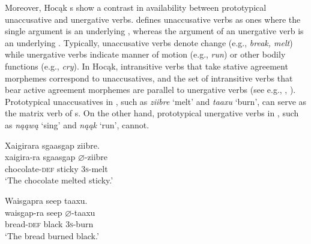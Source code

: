 \documentclass[output=paper]{LSP/langsci}
\begin{document}
Moreover, Hocąk s show a contrast in availability between prototypical unaccusative and unergative verbs. \citet{Perlmutter1978} defines unaccusative verbs as ones where the single argument is an underlying , whereas the argument of an unergative verb is an underlying . Typically, unaccusative verbs denote change (e.g., \textit{break, melt}) while unergative verbs indicate manner of motion (e.g., \textit{run}) or other bodily functions (e.g., \textit{cry}). In Hocąk, intransitive verbs that take stative agreement morphemes correspond to unaccusatives, and the set of intransitive verbs that bear active agreement morphemes are parallel to unergative verbs (see e.g., \citealt{Williamson1984}, \citealt{Woolford2010}). Prototypical unaccusatives in , such as \textit{ziibre} `melt' and \textit{taaxu} `burn', can serve as the matrix verb of s. On the other hand, prototypical unergative verbs in , such as \textit{nąąwą} `sing' and \textit{nąąk} `run', cannot.

\begin{exe}
\ex\label{ex:rosen:19}
\begin{xlist}

\ex \glll Xaigirara sgaasgap {ziibre}. \\
 xaigira-ra sgaasgap {$\varnothing$}-ziibre\\
chocolate-\textsc{def} sticky \textsc{3s}-melt\\
\glt `The chocolate melted sticky.'

\ex \glll Waisgapra seep {taaxu}.\\
 waisgap-ra seep {$\varnothing$}-taaxu\\
bread-\textsc{def} black \textsc{3s}-burn\\
\glt `The bread burned black.'

\end{xlist}
\end{exe}

\begin{exe}
\ex\label{ex:rosen:20}
\begin{xlist}



\end{xlist}
\end{exe}
\end{document}
